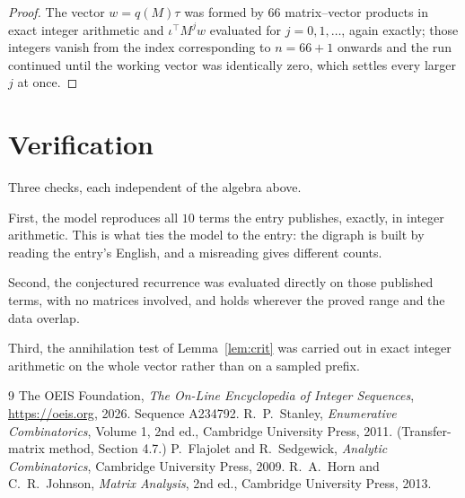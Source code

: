 \documentclass[11pt,a4paper]{article}
\theoremstyle{plain}
\theoremstyle{definition}
\begin{document}
\begin{proof}
The vector $w=q(M)\tau$ was formed by $66$ matrix--vector products in exact integer
arithmetic and $\iota^{\!\top}M^{j}w$ evaluated for $j=0,1,\dots$, again exactly; those
integers vanish from the index corresponding to $n=66+1$ onwards and the run continued
until the working vector was identically zero, which settles every larger $j$ at once.
\end{proof}

\section{Verification}

Three checks, each independent of the algebra above.

First, the model reproduces all $10$ terms the entry publishes, exactly, in integer
arithmetic. This is what ties the model to the entry: the digraph is built by reading the
entry's English, and a misreading gives different counts.

Second, the conjectured recurrence was evaluated directly on those published terms, with no
matrices involved, and holds wherever the proved range and the data overlap.

Third, the annihilation test of Lemma~\ref{lem:crit} was carried out in exact integer
arithmetic on the whole vector rather than on a sampled prefix.

\begin{thebibliography}{9}
 The OEIS Foundation, \emph{The On-Line Encyclopedia of Integer
Sequences}, \url{https://oeis.org}, 2026. Sequence A234792.
 R.~P.~Stanley, \emph{Enumerative Combinatorics}, Volume 1, 2nd ed.,
Cambridge University Press, 2011. (Transfer-matrix method, Section 4.7.)
 P.~Flajolet and R.~Sedgewick, \emph{Analytic Combinatorics}, Cambridge
University Press, 2009.
 R.~A.~Horn and C.~R.~Johnson, \emph{Matrix Analysis}, 2nd ed., Cambridge
University Press, 2013.
\end{thebibliography}
\end{document}
